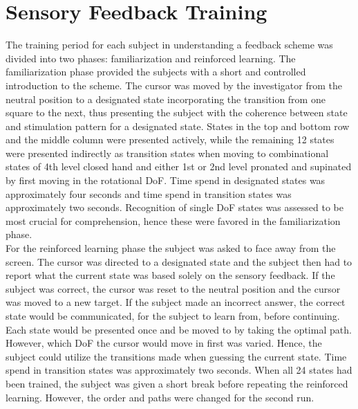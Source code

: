 \section{Sensory Feedback Training}

The training period for each subject in understanding a feedback scheme was divided into two phases: familiarization and reinforced learning. The familiarization phase provided the subjects with a short and controlled introduction to the scheme. The cursor was moved by the investigator from the neutral position to a designated state incorporating the transition from one square to the next, thus presenting the subject with the coherence between state and stimulation pattern for a designated state. States in the top and bottom row and the middle column were presented actively, while the remaining 12 states were presented indirectly as transition states when moving to combinational states of 4th level closed hand and either 1st or 2nd level pronated and supinated by first moving in the rotational DoF. Time spend in designated states was approximately four seconds and time spend in transition states was approximately two seconds. Recognition of single DoF states was assessed to be most crucial for comprehension, hence these were favored in the familiarization phase. \\
For the reinforced learning phase the subject was asked to face away from the screen. The cursor was directed to a designated state and the subject then had to report what the current state was based solely on the sensory feedback. If the subject was correct, the cursor was reset to the neutral position and the cursor was moved to a new target. If the subject made an incorrect answer, the correct state would be communicated, for the subject to learn from, before continuing. Each state would be presented once and be moved to by taking the optimal path. However, which DoF the cursor would move in first was varied. Hence, the subject could utilize the transitions made when guessing the current state. Time spend in transition states was approximately two seconds. When all 24 states had been trained, the subject was given a short break before repeating the reinforced learning. However, the order and paths were changed for the second run.